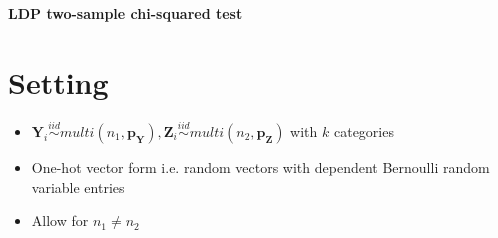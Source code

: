 \documentclass[11pt]{article} %
\newcommand{\vecBold}[1]{\boldsymbol{#1}} %
\newcommand{\sampleSize}{n}
\newcommand{\distparamMultinom}{\boldsymbol{p}}
\newcommand{\alphabetSize}{k}
\newcommand{\rvY}{Y}
\newcommand{\rVecY}{\vecBold{\rvY}}
\newcommand{\rvZ}{Z}
\newcommand{\rVecZ}{\vecBold{\rvZ}}
\begin{document}
\begin{center}
\LARGE \bf
LDP two-sample  chi-squared test
\end{center}

\begin{comment}
\begin{keyword}
\kwd{local differential privacy}
\kwd{two-sample testing}
\kwd{independence testing}
\kwd{minimax separation rates}
\end{keyword}

\end{comment}

\setcounter{tocdepth}{2}
\section{Setting}
\begin{itemize}
	\item $
\rVecY_i \stackrel{iid}{\sim}multi(\sampleSize_1, \distparamMultinom_{\rVecY}),
\rVecZ_i \stackrel{iid}{\sim}multi(\sampleSize_2, \distparamMultinom_{\rVecZ})$ with $\alphabetSize$ categories
	\item One-hot vector form i.e. random vectors with dependent Bernoulli random variable entries
	\item Allow for $n_1 \neq n_2$
	
\end{itemize}
\end{document}
